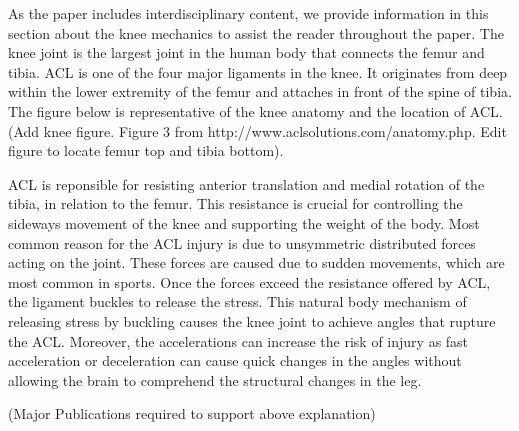As the paper includes interdisciplinary content, we provide information in this section about the knee mechanics to assist the reader throughout the paper. The knee joint is the largest joint in the human body that connects the femur and tibia. ACL is one of the four major ligaments in the knee. It originates from deep within the lower extremity of the femur and attaches in front of the spine of tibia. The figure below is representative of the knee anatomy and the location of ACL. 
\FIXME(Add knee figure. Figure 3 from http://www.aclsolutions.com/anatomy.php. Edit figure to locate femur top and tibia bottom).

ACL is reponsible for resisting anterior translation and medial rotation of the tibia, in relation to the femur. This resistance is crucial for controlling the sideways movement of the knee and supporting the weight of the body. Most common reason for the ACL injury is due to unsymmetric distributed forces acting on the joint. These forces are caused due to sudden movements, which are most common in sports. Once the forces exceed the resistance offered by ACL, the ligament buckles to release the stress. This natural body mechanism of releasing stress by buckling causes the knee joint to achieve angles that rupture the ACL. Moreover, the accelerations can increase the risk of injury as fast acceleration or deceleration can cause quick changes in the angles without allowing the brain to comprehend the structural changes in the leg.

\FIXME(Major Publications required to support above explanation) 